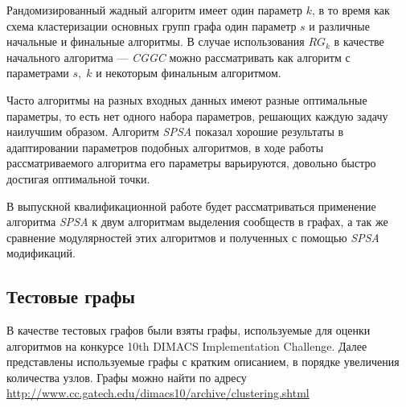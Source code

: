 Рандомизированный жадный алгоритм имеет один параметр $k$, в то время как схема кластеризации основных групп графа один параметр $s$ и различные начальные и финальные алгоритмы. В случае использования $RG_k$ в качестве начального алгоритма --- \emph{CGGC} можно рассматривать как алгоритм с параметрами $s,\;k$ и некоторым финальным алгоритмом.

Часто алгоритмы на разных входных данных имеют разные оптимальные параметры, то есть нет одного набора параметров, решающих каждую задачу наилучшим образом. Алгоритм \emph{SPSA} показал хорошие результаты в адаптировании параметров подобных алгоритмов, в ходе работы рассматриваемого алгоритма его параметры варьируются, довольно быстро достигая оптимальной точки.

В выпускной квалификационной работе будет рассматриваться применение алгоритма \emph{SPSA} к двум алгоритмам выделения сообществ в графах, а так же сравнение модулярностей этих алгоритмов и полученных с помощью \emph{SPSA} модификаций.



\subsection{Тестовые графы}

В качестве тестовых графов были взяты графы, используемые для оценки алгоритмов на конкурсе 10th DIMACS Implementation Challenge. Далее представлены используемые графы с кратким описанием, в порядке увеличения количества узлов. Графы можно найти по адресу \url{http://www.cc.gatech.edu/dimacs10/archive/clustering.shtml}

